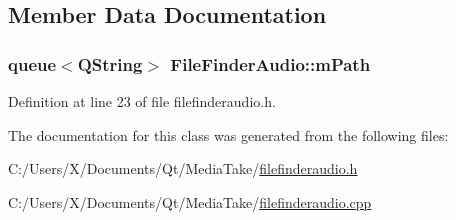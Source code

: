 \subsection{Member Data Documentation}
\hypertarget{class_file_finder_audio_a3a01ab7a81d46a6f15667476cc4ee71a}{
\subsubsection[{m\-Path}]{\setlength{\rightskip}{0pt plus 5cm}queue$<$Q\-String$>$ File\-Finder\-Audio\-::m\-Path\hspace{0.3cm}{\ttfamily [protected]}}}\label{class_file_finder_audio_a3a01ab7a81d46a6f15667476cc4ee71a}


Definition at line 23 of file filefinderaudio.\-h.



The documentation for this class was generated from the following files\-:\begin{DoxyCompactItemize}
\item 
C\-:/\-Users/\-X/\-Documents/\-Qt/\-Media\-Take/\hyperlink{filefinderaudio_8h}{filefinderaudio.\-h}\item 
C\-:/\-Users/\-X/\-Documents/\-Qt/\-Media\-Take/\hyperlink{filefinderaudio_8cpp}{filefinderaudio.\-cpp}\end{DoxyCompactItemize}
